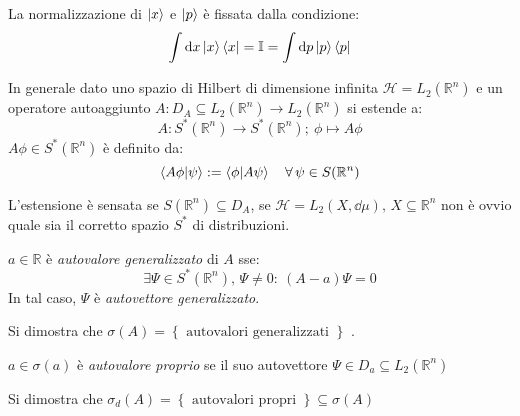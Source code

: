 \begin{remark}
    La normalizzazione di \(\ket{x}\) e \(\ket{p}\) è fissata dalla condizione:
    \begin{equation}
        \int \dd{x} \ket{x}\bra{x} = \mathbb{I} = \int \dd{p} \ket{p}\bra{p}
    \end{equation}

\end{remark}

In generale dato uno spazio di Hilbert di dimensione infinita \(\mathcal{H}= L_2(\mathbb{R}^n)\) e un operatore autoaggiunto \(A: D_A \subseteq L_2(\mathbb{R}^n)\to L_2(\mathbb{R}^n)\)
si estende a:
\begin{equation}
    A: S^*(\mathbb{R}^n)\to S^*(\mathbb{R}^n) ; \ \phi \mapsto A\phi
\end{equation}
\(A\phi \in S^*(\mathbb{R}^n)\) è definito da:
\[
    \braket{A\phi}{\psi}:=\braket{\phi}{A\psi} \quad \forall\, \psi \in S(\mathbb{R}^n)
\]
\begin{attention}
    L'estensione è sensata se \(S(\mathbb{R}^n)\subseteq D_A\), se \(\mathcal{H}= L_2(X, \dd{\mu}), \, X \subseteq \mathbb{R}^n \) non è ovvio 
    quale sia il corretto spazio \(S^*\) di distribuzioni.
\end{attention}
\begin{definition}
    \(a \in \mathbb{R}\) è \textit{autovalore generalizzato} di \(A\) sse:
    \[
        \exists\Psi \in S^*(\mathbb{R}^n), \,\Psi\neq 0 : \ (A-a)\Psi= 0
    \]
    In tal caso, \(\Psi\) è \textit{autovettore generalizzato}.
\end{definition}

Si dimostra che \(\sigma(A) = \left\{ \text{ autovalori generalizzati } \right\}\) .
\begin{definition}
    \(a \in \sigma(a)\) è \textit{autovalore proprio} se il suo autovettore \(\Psi \in D_a\subseteq L_2(\mathbb{R}^n)\)
\end{definition}

Si dimostra che \(\sigma_d(A)= \left\{ \text{ autovalori propri } \right\} \subseteq \sigma(A)\)


